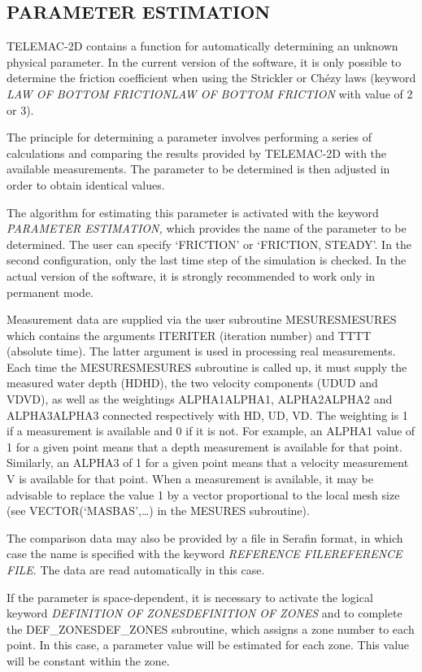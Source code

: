 \documentclass{article} %
\begin{document}
\subsection{ PARAMETER ESTIMATION}

 TELEMAC-2D contains a function for automatically determining an unknown physical parameter. In the current version of the software, it is only possible to determine the friction coefficient when using the Strickler or Ch\'{e}zy laws (keyword \textit{LAW OF BOTTOM FRICTIONLAW OF BOTTOM FRICTION} with value of 2 or 3).

 The principle for determining a parameter involves performing a series of calculations and comparing the results provided by TELEMAC-2D with the available measurements. The parameter to be determined is then adjusted in order to obtain identical values.

 The algorithm for estimating this parameter is activated with the keyword \textit{PARAMETER ESTIMATION,} which provides the name of the parameter to be determined. The user can specify `FRICTION' or `FRICTION, STEADY'. In the second configuration, only the last time step of the simulation is checked. In the actual version of the software, it is strongly recommended to work only in permanent mode.

 Measurement data are supplied via the user subroutine MESURESMESURES which contains the arguments ITERITER (iteration number) and TTTT (absolute time). The latter argument is used in processing real measurements. Each time the MESURESMESURES subroutine is called up, it must supply the measured water depth (HDHD), the two velocity components (UDUD and VDVD), as well as the weightings ALPHA1ALPHA1, ALPHA2ALPHA2 and ALPHA3ALPHA3 connected respectively with HD, UD, VD. The weighting is 1 if a measurement is available and 0 if it is not. For example, an ALPHA1 value of 1 for a given point means that a depth measurement is available for that point. Similarly, an ALPHA3 of 1 for a given point means that a velocity measurement V is available for that point. When a measurement is available, it may be advisable to replace the value 1 by a vector proportional to the local mesh size (see VECTOR(`MASBAS',{\dots}) in the MESURES subroutine).

 The comparison data may also be provided by a file in Serafin format, in which case the name is specified with the keyword \textit{REFERENCE FILEREFERENCE FILE}. The data are read automatically in this case.

 If the parameter is space-dependent, it is necessary to activate the logical keyword \textit{DEFINITION OF ZONESDEFINITION OF ZONES} and to complete the DEF\_ZONESDEF\_ZONES subroutine, which assigns a zone number to each point. In this case, a parameter value will be estimated for each zone. This value will be constant within the zone.
\end{document}
